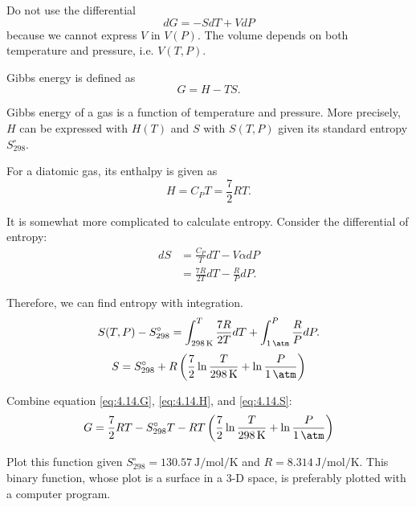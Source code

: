 \begin{@empty}
\begin{remark}
    Do not use the differential
    \[ dG = -SdT + VdP \]
    because we cannot express $V$ in $V(P)$.  The volume depends on both
    temperature and pressure, i.e. $V(T, P)$.
\end{remark}

\begin{answer}
    Gibbs energy is defined as
    \begin{equation}
        G = H - TS. \label{eq:4.14.G}
    \end{equation}

    Gibbs energy of a gas is a function of temperature and pressure.  More
    precisely, $H$ can be expressed with $H(T)$ and $S$ with $S(T, P)$ given
    its standard entropy $S_{298}^\circ$.

    For a diatomic gas, its enthalpy is given as
    \begin{equation}
        H = C_P T = \frac72 RT. \label{eq:4.14.H}
    \end{equation}

    It is somewhat more complicated to calculate entropy.  Consider the
    differential of entropy:
    \begin{align*}
        dS &= \frac{C_P}{T} dT - V\alpha dP \\
        &= \frac{7R}{2T} dT - \frac{R}{P} dP.
    \end{align*}

    Therefore, we can find entropy with integration.
    \[ S(T, P) - S_{298}^\circ = \int_{\SI{298}{\kelvin}}^T \frac{7R}{2T} dT + \int_{\SI{1}{\atm}}^P \frac{R}{P} dP.\]
    \begin{equation}
        S = S_{298}^\circ + R \left( \frac72 \ln\frac{T}{\SI{298}{\kelvin}} + \ln\frac{P}{\SI{1}{\atm}} \right)
        \label{eq:4.14.S}
    \end{equation}

    Combine equation \eqref{eq:4.14.G}, \eqref{eq:4.14.H}, and
    \eqref{eq:4.14.S}:
    \[ G = \frac72 RT - S_{298}^\circ T - RT \left( \frac72 \ln\frac{T}{\SI{298}{\kelvin}} + \ln\frac{P}{\SI{1}{\atm}} \right) \]

    Plot this function given $S_{298}^\circ = \SI{130.57}{\joule\per\mol\per\kelvin}$
    and $R = \SI{8.314}{\joule\per\mol\per\kelvin}$.  This binary function,
    whose plot is a surface in a 3-D space, is preferably plotted with a
    computer program.
\end{answer}
\end{@empty}
